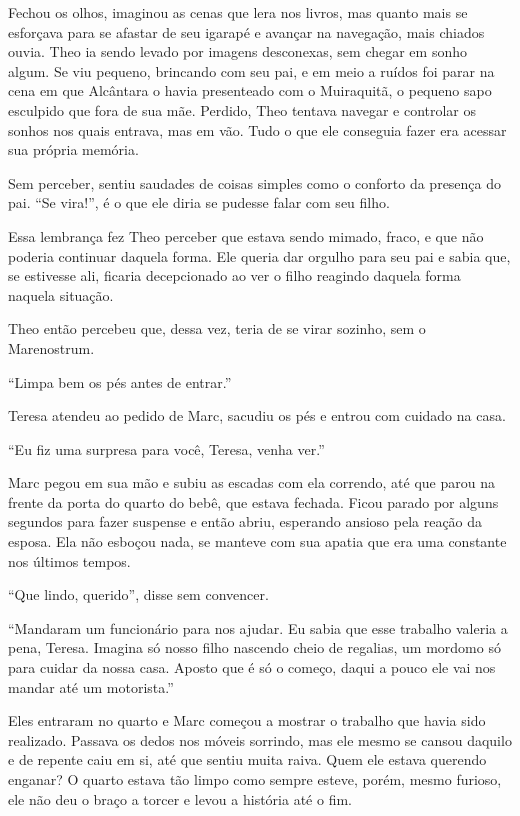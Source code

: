 Fechou os olhos, imaginou as cenas que lera nos livros, mas quanto mais
se esforçava para se afastar de seu igarapé e avançar na navegação, mais
chiados ouvia. Theo ia sendo levado por imagens desconexas, sem chegar
em sonho algum. Se viu pequeno, brincando com seu pai, e em meio a
ruídos foi parar na cena em que Alcântara o havia presenteado com o
Muiraquitã, o pequeno sapo esculpido que fora de sua mãe. Perdido, Theo
tentava navegar e controlar os sonhos nos quais entrava, mas em vão.
Tudo o que ele conseguia fazer era acessar sua própria memória.

Sem perceber, sentiu saudades de coisas simples como o conforto da
presença do pai. ``Se vira!'', é o que ele diria se pudesse falar com
seu filho.

Essa lembrança fez Theo perceber que estava sendo mimado, fraco, e que
não poderia continuar daquela forma. Ele queria dar orgulho para seu pai
e sabia que, se estivesse ali, ficaria decepcionado ao ver o filho
reagindo daquela forma naquela situação.

Theo então percebeu que, dessa vez, teria de se virar sozinho, sem o
Marenostrum.

\asterisc


``Limpa bem os pés antes de entrar.''

Teresa atendeu ao pedido de Marc, sacudiu os pés e entrou com cuidado na
casa.

``Eu fiz uma surpresa para você, Teresa, venha ver.''

Marc pegou em sua mão e subiu as escadas com ela correndo, até que parou
na frente da porta do quarto do bebê, que estava fechada. Ficou parado
por alguns segundos para fazer suspense e então abriu, esperando ansioso
pela reação da esposa. Ela não esboçou nada, se manteve com sua apatia
que era uma constante nos últimos tempos.

``Que lindo, querido'', disse sem convencer.

``Mandaram um funcionário para nos ajudar. Eu sabia que esse trabalho
valeria a pena, Teresa. Imagina só nosso filho nascendo cheio de
regalias, um mordomo só para cuidar da nossa casa. Aposto que é só o
começo, daqui a pouco ele vai nos mandar até um motorista.''

Eles entraram no quarto e Marc começou a mostrar o trabalho que havia
sido realizado. Passava os dedos nos móveis sorrindo, mas ele mesmo se
cansou daquilo e de repente caiu em si, até que sentiu muita raiva. Quem
ele estava querendo enganar? O quarto estava tão limpo como sempre
esteve, porém, mesmo furioso, ele não deu o braço a torcer e levou a
história até o fim.

